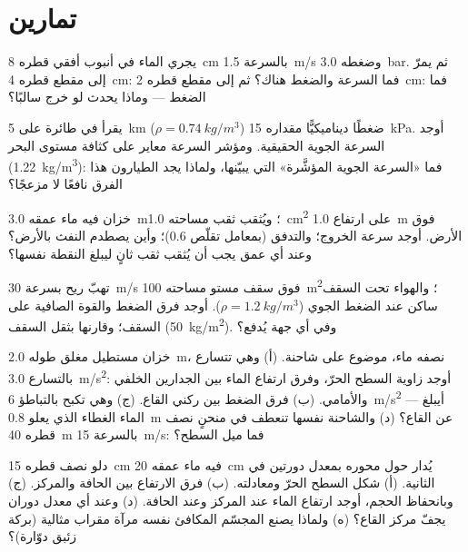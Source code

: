 \section{تمارين}

\begin{exercise}[$\star$]\label{exo:b2:euler-bernoulli:1}
يجري الماء في أنبوب أفقي قطره \qty{8}{cm} بالسرعة \qty{1.5}{m/s}
وضغطه \qty{3.0}{bar}. ثم يمرّ إلى مقطع قطره \qty{4}{cm}: فما السرعة
والضغط هناك؟ ثم إلى مقطع قطره \qty{2}{cm}: فما الضغط --- وماذا يحدث
لو خرج سالبًا؟
\end{exercise}

\begin{exercise}[$\star$]\label{exo:b2:euler-bernoulli:2}
يقرأ  في طائرة على \qty{5}{km} ($\rho = \qty{0.74}{kg/m^3}$)
ضغطًا ديناميكيًّا مقداره \qty{15}{kPa}. أوجد السرعة الجوية
الحقيقية. ومؤشر السرعة معاير على كثافة مستوى البحر (\qty{1.22}{kg/m^3}):
فما «السرعة الجوية المؤشَّرة» التي يبيّنها، ولماذا يجد
الطيارون هذا الفرق نافعًا لا مزعجًا؟
\end{exercise}

\begin{exercise}[$\star$]\label{exo:b2:euler-bernoulli:3}
خزان فيه ماء عمقه \qty{3.0}{m}؛ ويُثقب ثقب مساحته \qty{1.0}{cm^2}
على ارتفاع \qty{1.0}{m} فوق الأرض. أوجد سرعة الخروج؛ والتدفق (بمعامل
تقلّص $0.6$)؛ وأين يصطدم النفث بالأرض؟ وعند أي عمق يجب أن يُثقب
ثقب ثانٍ ليبلغ النقطة نفسها؟
\end{exercise}

\begin{exercise}[$\star$]\label{exo:b2:euler-bernoulli:4}
تهبّ ريح بسرعة \qty{30}{m/s} فوق سقف مستو مساحته \qty{100}{m^2}؛
والهواء تحت السقف ساكن عند الضغط الجوي ($\rho = \qty{1.2}{kg/m^3}$).
أوجد فرق الضغط والقوة الصافية على السقف؛ وقارنها بثقل
السقف (\qty{50}{kg/m^2}). وفي أي جهة يُدفع؟
\end{exercise}

\begin{exercise}[$\star\star$]\label{exo:b2:euler-bernoulli:5}
خزان مستطيل مغلق طوله \qty{2.0}{m}، نصفه ماء، موضوع على
شاحنة. (أ) وهي تتسارع بالتسارع \qty{3.0}{m/s^2}: أوجد زاوية السطح
الحرّ، وفرق ارتفاع الماء بين الجدارين الخلفي والأمامي.
(ب) فرق الضغط بين ركني القاع. (ج) وهي تكبح
بالتباطؤ \qty{6}{m/s^2} --- أيبلغ الماء الغطاء الذي يعلو \qty{0.8}{m}
عن القاع؟ (د) والشاحنة نفسها تنعطف في منحنٍ نصف قطره \qty{40}{m}
بالسرعة \qty{15}{m/s}: فما ميل السطح؟
\end{exercise}

\begin{exercise}[$\star\star$]\label{exo:b2:euler-bernoulli:6}
دلو نصف قطره \qty{15}{cm} فيه ماء عمقه \qty{20}{cm} يُدار حول
محوره بمعدل دورتين في الثانية. (أ) شكل السطح الحرّ ومعادلته.
(ب) فرق الارتفاع بين الحافة والمركز. (ج) وبانحفاظ الحجم، أوجد
ارتفاع الماء عند المركز وعند الحافة. (د) وعند أي معدل دوران
يجفّ مركز القاع؟ (ه) ولماذا يصنع المجسّم المكافئ نفسه مرآة
مقراب مثالية (بركة زئبق دوّارة)؟
\end{exercise}

